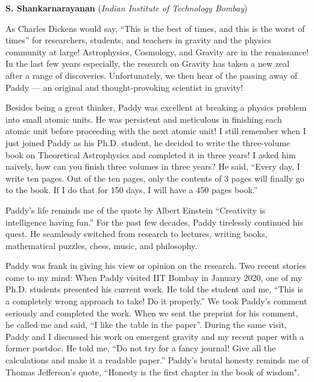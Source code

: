 \documentclass[prd, preprint, longbibliography, 11pt]{revtex4-1}
\begin{document}
\bigskip

\bigskip

\centerline{{\bf S. Shankarnarayanan} ({\it Indian Institute of Technology Bombay})}
\medskip
{}

As Charles Dickens would say, “This is the best of times, and this is the worst of times” for researchers, students, and teachers in gravity and the physics community at large! Astrophysics, Cosmology, and Gravity are in the renaissance! In the last few years especially, the research on Gravity has taken a new zeal after a range of discoveries. Unfortunately, we then hear  of the passing away of Paddy --- an original and thought-provoking scientist in gravity!  

Besides being a great thinker, Paddy was excellent at breaking a physics problem into small atomic units. He was persistent and meticulous in finishing each atomic unit before proceeding with the next atomic unit! I still remember when I just joined Paddy as his Ph.D. student, he decided to write the three-volume book on Theoretical Astrophysics and completed it in three years! I asked him naively, how can you finish three volumes in three years? He said, “Every day, I write ten pages. Out of the ten pages, only the contents of 3 pages will finally go to the book. If I do that for 150 days, I will have a 450 pages book.” 

Paddy’s life reminds me of the quote by Albert Einstein “Creativity is intelligence having fun.” For the past few decades, Paddy tirelessly continued his quest.  He seamlessly switched from research to lectures, writing books, mathematical puzzles, chess, music, and philosophy.  

Paddy was frank in giving his view or opinion on the research. Two recent stories come to my mind: When Paddy visited IIT Bombay in January 2020, one of my Ph.D. students presented his current work. He told the student and me, “This is a completely wrong approach to take! Do it properly.” We took Paddy’s comment seriously and completed the work. When we sent the preprint for his comment, he called me and said, “I like the table in the paper”. During the same visit, Paddy and I discussed his work on emergent gravity and my recent paper with a former postdoc. He told me, “Do not try for a fancy journal! Give all the calculations and make it a readable paper.” Paddy’s brutal honesty reminds me of Thomas Jefferson’s quote, “Honesty is the first chapter in the book of wisdom".
\end{document}
